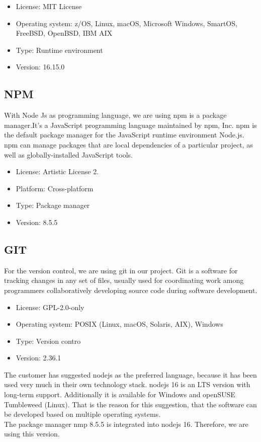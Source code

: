 \documentclass[12pt, a4paper]{article}
\begin{document}
\begin{itemize}
    \item License: MIT License
    \item Operating system: z/OS, Linux, macOS, Microsoft Windows, SmartOS, FreeBSD, OpenBSD, IBM AIX
    \item Type: Runtime environment
    \item Version: 16.15.0
\end{itemize}

\subsection*{NPM}

With Node Js as programming language, we are using npm is a package manager.It's a JavaScript programming language maintained by npm, Inc. npm is the default package manager for the JavaScript runtime environment Node.js. npm can manage packages that are local dependencies of a particular project, as well as globally-installed JavaScript tools.

\begin{itemize}
    \item License: Artistic License 2.
    \item Platform: Cross-platform
    \item Type: Package manager
    \item Version: 8.5.5
\end{itemize}

\subsection*{GIT}

For the version control, we are using git in our project. Git is a software for tracking changes in any set of files, usually used for coordinating work among programmers collaboratively developing source code during software development.

\begin{itemize}
    \item License: GPL-2.0-only
    \item Operating system: POSIX (Linux, macOS, Solaris, AIX), Windows
    \item Type: Version contro
    \item Version: 2.36.1
\end{itemize}

\noindent The customer has suggested nodejs as the preferred language, because it has been used very much in their own technology stack. nodejs 16 is an LTS version with long-term support. Additionally it is available for Windows and openSUSE Tumbleweed (Linux). That is the reason for this suggestion, that the software can be developed based on multiple operating systems. \\
The package manager nmp 8.5.5 is integrated into nodejs 16. Therefore, we are using this version.
\end{document}
